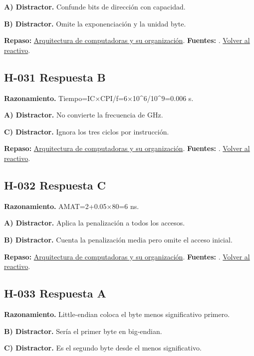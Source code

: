 \textbf{A) Distractor. }Confunde bits de dirección con capacidad.

\textbf{B) Distractor. }Omite la exponenciación y la unidad byte.

\textbf{Repaso:} \hyperref[sec:h2]{Arquitectura de computadoras y su organización}. \textbf{Fuentes:} \cite{intel,architecture}. \hyperref[q:H-030]{Volver al reactivo}.\par\medskip

\subsection*{H-031 \quad Respuesta B}\label{s:H-031}
\textbf{Razonamiento.} Tiempo=IC×CPI/f=6×10\textasciicircum{}6/10\textasciicircum{}9=0.006 s.

\textbf{A) Distractor. }No convierte la frecuencia de GHz.

\textbf{C) Distractor. }Ignora los tres ciclos por instrucción.

\textbf{Repaso:} \hyperref[sec:h2]{Arquitectura de computadoras y su organización}. \textbf{Fuentes:} \cite{intel,architecture}. \hyperref[q:H-031]{Volver al reactivo}.\par\medskip

\subsection*{H-032 \quad Respuesta C}\label{s:H-032}
\textbf{Razonamiento.} AMAT=2+0.05×80=6 ns.

\textbf{A) Distractor. }Aplica la penalización a todos los accesos.

\textbf{B) Distractor. }Cuenta la penalización media pero omite el acceso inicial.

\textbf{Repaso:} \hyperref[sec:h2]{Arquitectura de computadoras y su organización}. \textbf{Fuentes:} \cite{intel,architecture}. \hyperref[q:H-032]{Volver al reactivo}.\par\medskip

\subsection*{H-033 \quad Respuesta A}\label{s:H-033}
\textbf{Razonamiento.} Little-endian coloca el byte menos significativo primero.

\textbf{B) Distractor. }Sería el primer byte en big-endian.

\textbf{C) Distractor. }Es el segundo byte desde el menos significativo.

